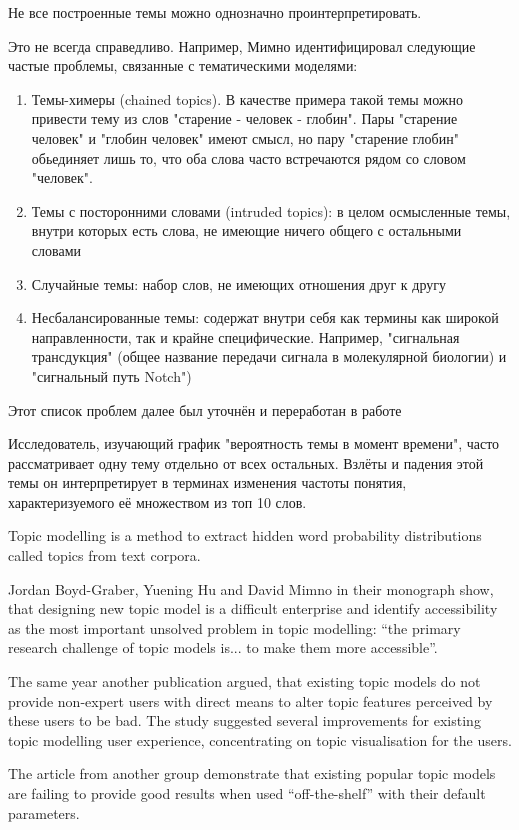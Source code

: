 Не все построенные темы можно однозначно проинтерпретировать.

Это не всегда справедливо. Например, Мимно \cite{Mimno} идентифицировал следующие частые проблемы, связанные с тематическими моделями:
\begin{enumerate}
\item{Темы-химеры (chained topics). В качестве примера такой темы можно привести тему из слов "старение - человек - глобин". Пары "старение человек" и "глобин человек" имеют смысл, но пару "старение глобин" обьединяет лишь то, что оба слова часто встречаются рядом со словом "человек".}
\item{Темы с посторонними словами (intruded topics): в целом осмысленные темы, внутри которых есть слова, не имеющие ничего общего с остальными словами}
\item{Случайные темы: набор слов, не имеющих отношения друг к другу}
\item{Несбалансированные темы: содержат внутри себя как термины как широкой направленности, так и крайне специфические. Например, "сигнальная трансдукция" (общее название передачи сигнала в молекулярной биологии) и "сигнальный путь Notch")}
\end{enumerate}

Этот список проблем далее был уточнён и переработан в работе \cite{TODO} 




Исследователь, изучающий график "вероятность темы в момент времени", часто рассматривает одну тему отдельно от всех остальных. Взлёты и падения этой темы он интерпретирует в терминах изменения частоты понятия, характеризуемого её множеством из топ 10 слов.




Topic modelling is a method to extract hidden word probability distributions called topics from text corpora. 



Jordan Boyd-Graber, Yuening Hu and David Mimno in their monograph \cite{fntir} show, that designing new topic model is a difficult enterprise and identify accessibility as the most important unsolved problem in topic modelling: ``the primary research challenge of topic models is... to make them more accessible''.

The same year another publication \cite{lee2017human} argued, that existing topic models do not provide non-expert users with direct means to alter topic features perceived by these users to be bad. The study suggested several improvements for existing topic modelling user experience, concentrating on topic visualisation for the users.

The article from another group \cite{agrawal2018wrong} demonstrate that existing popular topic models are failing to provide good results when used ``off-the-shelf'' with their default parameters.
